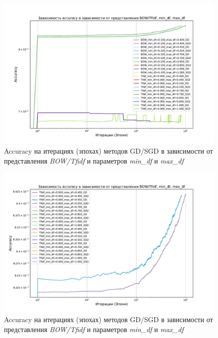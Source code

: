 \documentclass[14pt]{extarticle}
\begin{document}
\begin{figure}[H]
    \centering
    \includegraphics[width=0.85\linewidth]
    {exp_8_min_max_df_acc_3.pdf}
    \caption{Accuracy на итерациях (эпохах) методов GD/SGD в зависимости от представления \textit{BOW/Tfidf} и параметров \textit{min\_df} и \textit{max\_df}}
    \label{fig:exp_8_min_max_df_acc_3}
\end{figure}

\begin{figure}[H]
    \centering
    \includegraphics[width=0.85\linewidth]
    {exp_8_min_max_df_acc_4.pdf}
    \caption{Accuracy на итерациях (эпохах) методов GD/SGD в зависимости от представления \textit{BOW/Tfidf} и параметров \textit{min\_df} и \textit{max\_df}}
    \label{fig:exp_8_min_max_df_acc_4}
\end{figure}
\end{document}
